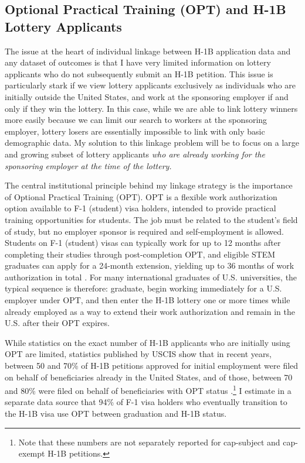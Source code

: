 \subsection{Optional Practical Training (OPT) and H-1B Lottery Applicants}

The issue at the heart of individual linkage between H-1B application data and any dataset of outcomes is that I have very limited information on lottery applicants who do not subsequently submit an H-1B petition. This issue is particularly stark if we view lottery applicants exclusively as individuals who are initially outside the United States, and work at the sponsoring employer if and only if they win the lottery. In this case, while we are able to link lottery winners more easily because we can limit our search to workers at the sponsoring employer, lottery losers are essentially impossible to link with only basic demographic data. My solution to this linkage problem will be to focus on a large and growing subset of lottery applicants \textit{who are already working for the sponsoring employer at the time of the lottery.}

The central institutional principle behind my linkage strategy is the importance of Optional Practical Training (OPT). OPT is a flexible work authorization option available to F-1 (student) visa holders, intended to provide practical training opportunities for students. The job must be related to the student's field of study, but no employer sponsor is required and self-employment is allowed. Students on F-1 (student) visas can typically work for up to 12 months after completing their studies through post-completion OPT, and eligible STEM graduates can apply for a 24-month extension, yielding up to 36 months of work authorization in total \citep{ice_practical_training_2024, uscis_opt_2024}. For many international graduates of U.S. universities, the typical sequence is therefore: graduate, begin working immediately for a U.S. employer under OPT, and then enter the H-1B lottery one or more times while already employed as a way to extend their work authorization and remain in the U.S. after their OPT expires. 

While statistics on the exact number of H-1B applicants who are initially using OPT are limited, statistics published by USCIS show that in recent years, between 50 and 70\% of H-1B petitions approved for initial employment were filed on behalf of beneficiaries already in the United States, and of those, between 70 and 80\% were filed on behalf of beneficiaries with OPT status \citep{uscis_h1b_characteristics_2024}.\footnote{Note that these numbers are not separately reported for cap-subject and cap-exempt H-1B petitions.}
I estimate in a separate data source that 94\% of F-1 visa holders who eventually transition to the H-1B visa use OPT between graduation and H-1B status.

